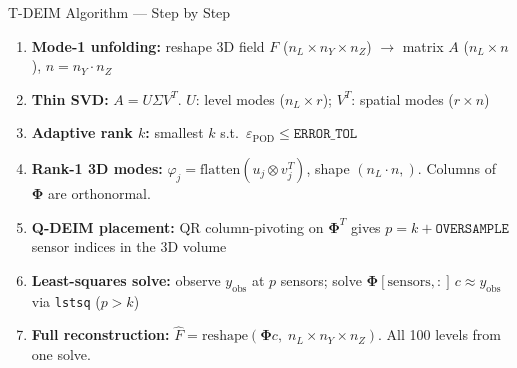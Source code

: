 \documentclass[aspectratio=169, 11pt]{beamer}
\newcommand{\epod}{\varepsilon_{\mathrm{POD}}}
\newcommand{\Phimat}{\boldsymbol{\Phi}}
\begin{document}
\begin{frame}{T-DEIM Algorithm — Step by Step}
\small
\begin{enumerate}\setlength\itemsep{0.35em}
  \item \textbf{Mode-1 unfolding:} reshape 3D field $F$ ($n_L \!\times\! n_Y \!\times\! n_Z$)
        $\to$ matrix $A$ ($n_L \!\times\! n$), \; $n = n_Y \cdot n_Z$

  \item \textbf{Thin SVD:} $A = U\Sigma V^T$. \quad
        $U$: level modes ($n_L \!\times\! r$); \;
        $V^T$: spatial modes ($r \!\times\! n$)

  \item \textbf{Adaptive rank $k$:} smallest $k$ s.t.\
        $\epod \leq \texttt{ERROR\_TOL}$

  \item \textbf{Rank-1 3D modes:}
        $\varphi_j = \mathrm{flatten}(u_j \otimes v_j^T)$, shape $(n_L \cdot n,)$.
        Columns of $\Phimat$ are orthonormal.

  \item \textbf{Q-DEIM placement:} QR column-pivoting on $\Phimat^T$
        gives $p = k + \texttt{OVERSAMPLE}$ sensor indices in the 3D volume

  \item \textbf{Least-squares solve:} observe $y_\mathrm{obs}$ at $p$ sensors;
        solve $\Phimat[\mathrm{sensors},:]\,c \approx y_\mathrm{obs}$
        via \texttt{lstsq} \;($p > k$)

  \item \textbf{Full reconstruction:}
        $\hat{F} = \mathrm{reshape}(\Phimat c,\; n_L \!\times\! n_Y \!\times\! n_Z)$.
        All 100 levels from one solve.
\end{enumerate}
\end{frame}
\end{document}
